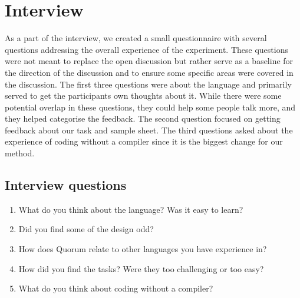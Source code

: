 \section{Interview}
As a part of the interview, we created a small questionnaire with several questions addressing the overall experience of the experiment.
These questions were not meant to replace the open discussion but rather serve as a baseline for the direction of the discussion and to ensure some specific areas were covered in the discussion.
The first three questions were about the language and primarily served to get the participants own thoughts about it.
While there were some potential overlap in these questions, they could help some people talk more, and they helped categorise the feedback.
The second question focused on getting feedback about our task and sample sheet.
The third questions asked about the experience of coding without a compiler since it is the biggest change for our method.

\subsection{Interview questions}
\begin{enumerate}
\item What do you think about the language? Was it easy to learn?
\item Did you find some of the design odd?
\item How does Quorum relate to other languages you have experience in?
\item How did you find the tasks? Were they too challenging or too easy?
\item What do you think about coding without a compiler?
\end{enumerate}	